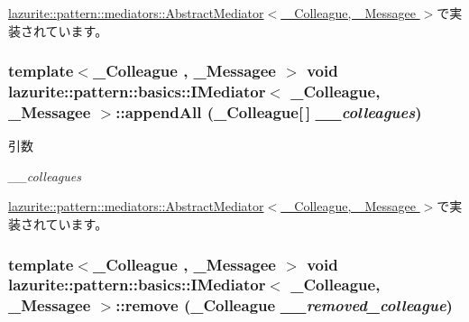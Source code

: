\hyperlink{classlazurite_1_1pattern_1_1mediators_1_1_abstract_mediator_3_01___colleague_00_01___messagee_01_4_a75e131257e618fe1179efcb4d6b117fe}{lazurite::pattern::mediators::AbstractMediator$<$ \_\-Colleague, \_\-Messagee $>$}で実装されています。\hypertarget{interfacelazurite_1_1pattern_1_1basics_1_1_i_mediator_3_01___colleague_00_01___messagee_01_4_a60acf7d5d011dd442fc651b2bfb49081}{
\subsubsection[{appendAll}]{\setlength{\rightskip}{0pt plus 5cm}template$<$\_\-Colleague , \_\-Messagee $>$ void lazurite::pattern::basics::IMediator$<$ \_\-Colleague, \_\-Messagee $>$::appendAll (\_\-Colleague\mbox{[}$\,$\mbox{]} {\em \_\-\_\-colleagues})}}
\label{interfacelazurite_1_1pattern_1_1basics_1_1_i_mediator_3_01___colleague_00_01___messagee_01_4_a60acf7d5d011dd442fc651b2bfb49081}

\begin{DoxyParams}{引数}
\item[{\em \_\-\_\-colleagues}]\end{DoxyParams}


\hyperlink{classlazurite_1_1pattern_1_1mediators_1_1_abstract_mediator_3_01___colleague_00_01___messagee_01_4_a0064ee99fdcea9cc60a204bcb60ab55b}{lazurite::pattern::mediators::AbstractMediator$<$ \_\-Colleague, \_\-Messagee $>$}で実装されています。\hypertarget{interfacelazurite_1_1pattern_1_1basics_1_1_i_mediator_3_01___colleague_00_01___messagee_01_4_a867d7d49b3bb27af92b9ae425a09f956}{
\subsubsection[{remove}]{\setlength{\rightskip}{0pt plus 5cm}template$<$\_\-Colleague , \_\-Messagee $>$ void lazurite::pattern::basics::IMediator$<$ \_\-Colleague, \_\-Messagee $>$::remove (\_\-Colleague {\em \_\-\_\-removed\_\-colleague})}}
\label{interfacelazurite_1_1pattern_1_1basics_1_1_i_mediator_3_01___colleague_00_01___messagee_01_4_a867d7d49b3bb27af92b9ae425a09f956}

